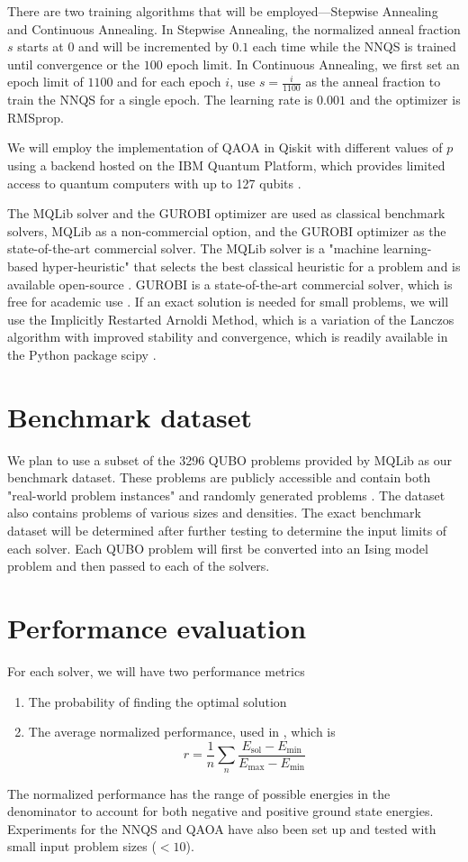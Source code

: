 There are two training algorithms that will be employed---Stepwise Annealing and Continuous Annealing. In Stepwise Annealing, the normalized anneal fraction $s$ starts at $0$ and will be incremented by $0.1$ each time while the NNQS is trained until convergence or the $100$ epoch limit. In Continuous Annealing, we first set an epoch limit of $1100$ and for each epoch $i$, use $s = \frac{i}{1100}$ as the anneal fraction to train the NNQS for a single epoch. The learning rate is $0.001$ and the optimizer is RMSprop.

We will employ the implementation of QAOA in Qiskit with different values of $p$ using a backend hosted on the IBM Quantum Platform, which provides limited access to quantum computers with up to 127 qubits \cite{b24}.

The MQLib solver and the GUROBI optimizer are used as classical benchmark solvers, MQLib as a non-commercial option, and the GUROBI optimizer as the state-of-the-art commercial solver. The MQLib solver is a "machine learning-based hyper-heuristic" that selects the best classical heuristic for a problem and is available open-source \cite{b12}. GUROBI is a state-of-the-art commercial solver, which is free for academic use \cite{b26}. If an exact solution is needed for small problems, we will use the Implicitly Restarted Arnoldi Method, which  is a variation of the Lanczos algorithm with improved stability and convergence, which is readily available in the Python package scipy \cite{b29}.

\section{Benchmark dataset}
We plan to use a subset of the 3296 QUBO problems provided by MQLib as our benchmark dataset. These problems are publicly accessible and contain both "real-world problem instances" and randomly generated problems \cite{b12}. The dataset also contains problems of various sizes and densities. The exact benchmark dataset will be determined after further testing to determine the input limits of each solver. Each QUBO problem will first be converted into an Ising model problem and then passed to each of the solvers.

\section{Performance evaluation}
For each solver, we will have two performance metrics 
\begin{enumerate}
    \item The probability of finding the optimal solution
    \item The average normalized performance, used in \cite{b34}, which is 
    \begin{equation}
        r = \frac{1}{n} \sum_n \frac{E_{\text{sol}} - E_{\min}}{E_{\max} - E_{\min}}
    \end{equation}
\end{enumerate}

The normalized performance has the range of possible energies in the denominator to account for both negative and positive ground state energies. Experiments for the NNQS and QAOA have also been set up and tested with small input problem sizes ($<10$).